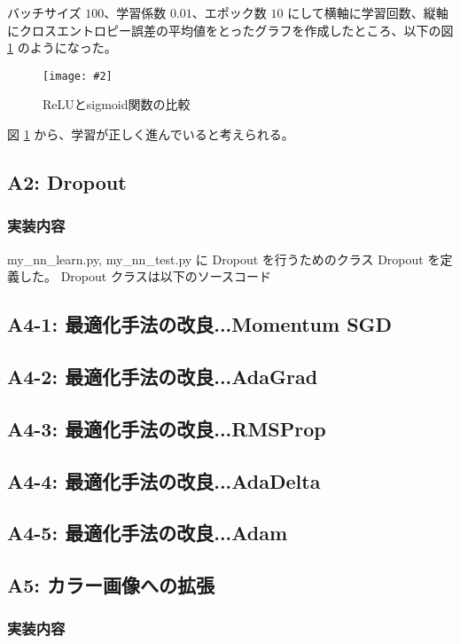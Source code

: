 \documentclass[a4paper,dvipdfmx]{jsarticle}
\newcommand{\image}[3]{
    \begin{figure}[H]
        \begin{center}
        \texttt{[image: \#2]}
        \end{center}
        \caption{#1}
        \label{#3}
    \end{figure}
}
\begin{document}
バッチサイズ $100$、学習係数 $0.01$、エポック数 $10$ にして横軸に学習回数、縦軸にクロスエントロピー誤差の平均値をとったグラフを作成したところ、以下の図 \ref{fig-A-1-1} のようになった。

\image{ReLUとsigmoid関数の比較}{report_a1-1.png}{fig-A-1-1}


図 \ref{fig-A-1-1} から、学習が正しく進んでいると考えられる。

\subsection*{A2: Dropout}

\subsubsection*{実装内容}

my\_nn\_learn.py, my\_nn\_test.py に Dropout を行うためのクラス Dropout を定義した。
Dropout クラスは以下のソースコード

\subsection*{A4-1: 最適化手法の改良...Momentum SGD}


\subsection*{A4-2: 最適化手法の改良...AdaGrad}

\subsection*{A4-3: 最適化手法の改良...RMSProp}

\subsection*{A4-4: 最適化手法の改良...AdaDelta}

\subsection*{A4-5: 最適化手法の改良...Adam}

\subsection*{A5: カラー画像への拡張}

\subsubsection*{実装内容}
\end{document}
